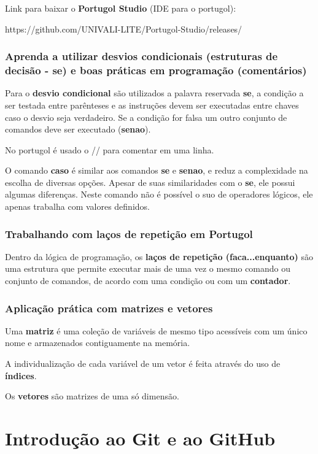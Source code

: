 \documentclass[12pt,a4paper]{article}
\begin{document}
	Link para baixar o \textbf{Portugol Studio} (IDE para o portugol):
	
	https://github.com/UNIVALI-LITE/Portugol-Studio/releases/
	
	\subsubsection{Aprenda a utilizar desvios condicionais (estruturas de decisão - se) e boas práticas em programação (comentários)}
	
	Para o \textbf{desvio condicional} são utilizados a palavra reservada \textbf{se}, a condição a ser testada entre parênteses e as instruções devem ser executadas entre chaves caso o desvio seja verdadeiro. Se a condição for falsa um outro conjunto de comandos deve ser executado (\textbf{senao}).
	
	No portugol é usado o // para comentar em uma linha.
	
	O comando \textbf{caso} é similar aos comandos \textbf{se} e \textbf{senao}, e reduz a complexidade na escolha de diversas opções. Apesar de suas similaridades com o \textbf{se}, ele possui algumas diferenças. Neste comando não é possível o suo de operadores lógicos, ele apenas trabalha com valores definidos.
	
	\subsubsection{Trabalhando com laços de repetição em Portugol}
	
	Dentro da lógica de programação, os \textbf{laços de repetição (faca...enquanto)} são uma estrutura que permite executar mais de uma vez o mesmo comando ou conjunto de comandos, de acordo com uma condição ou com um \textbf{contador}.
	
	\subsubsection{Aplicação prática com matrizes e vetores}
	
	Uma \textbf{matriz} é uma coleção de variáveis de mesmo tipo acessíveis com um único nome e armazenados contiguamente na memória.
	
	A individualização de cada variável de um vetor é feita através do uso de \textbf{índices}.
	
	Os \textbf{vetores} são matrizes de uma só dimensão.
	
	\section{Introdução ao Git e ao GitHub}
	
\end{document}
